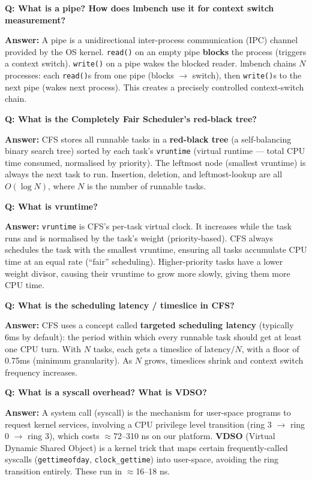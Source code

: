 \documentclass[12pt,a4paper]{article}
\newcommand{\Q}[1]{\begin{mdframed}[style=qbox]
\textbf{\textcolor{qcol}{Q: #1}}\end{mdframed}\vspace{2pt}}
\newcommand{\A}[1]{\begin{mdframed}[style=abox]
\textbf{\textcolor{acol}{Answer:}} #1\end{mdframed}\vspace{10pt}}
\begin{document}
\Q{What is a pipe? How does lmbench use it for context switch measurement?}
\A{A pipe is a unidirectional inter-process communication (IPC) channel provided by the OS kernel. \texttt{read()} on an empty pipe \textbf{blocks} the process (triggers a context switch). \texttt{write()} on a pipe wakes the blocked reader. lmbench chains $N$ processes: each \texttt{read()}s from one pipe (blocks $\rightarrow$ switch), then \texttt{write()}s to the next pipe (wakes next process). This creates a precisely controlled context-switch chain.}

\Q{What is the Completely Fair Scheduler's red-black tree?}
\A{CFS stores all runnable tasks in a \textbf{red-black tree} (a self-balancing binary search tree) sorted by each task's \texttt{vruntime} (virtual runtime --- total CPU time consumed, normalised by priority). The leftmost node (smallest vruntime) is always the next task to run. Insertion, deletion, and leftmost-lookup are all $O(\log N)$, where $N$ is the number of runnable tasks.}

\Q{What is vruntime?}
\A{\texttt{vruntime} is CFS's per-task virtual clock. It increases while the task runs and is normalised by the task's weight (priority-based). CFS always schedules the task with the smallest vruntime, ensuring all tasks accumulate CPU time at an equal rate (``fair'' scheduling). Higher-priority tasks have a lower weight divisor, causing their vruntime to grow more slowly, giving them more CPU time.}

\Q{What is the scheduling latency / timeslice in CFS?}
\A{CFS uses a concept called \textbf{targeted scheduling latency} (typically 6ms by default): the period within which every runnable task should get at least one CPU turn. With $N$ tasks, each gets a timeslice of $\text{latency}/N$, with a floor of 0.75ms (minimum granularity). As $N$ grows, timeslices shrink and context switch frequency increases.}

\Q{What is a syscall overhead? What is VDSO?}
\A{A system call (syscall) is the mechanism for user-space programs to request kernel services, involving a CPU privilege level transition (ring 3 $\to$ ring 0 $\to$ ring 3), which costs $\approx$72--310 ns on our platform. \textbf{VDSO} (Virtual Dynamic Shared Object) is a kernel trick that maps certain frequently-called syscalls (\texttt{gettimeofday}, \texttt{clock\_gettime}) into user-space, avoiding the ring transition entirely. These run in $\approx$16--18 ns.}

\end{document}
